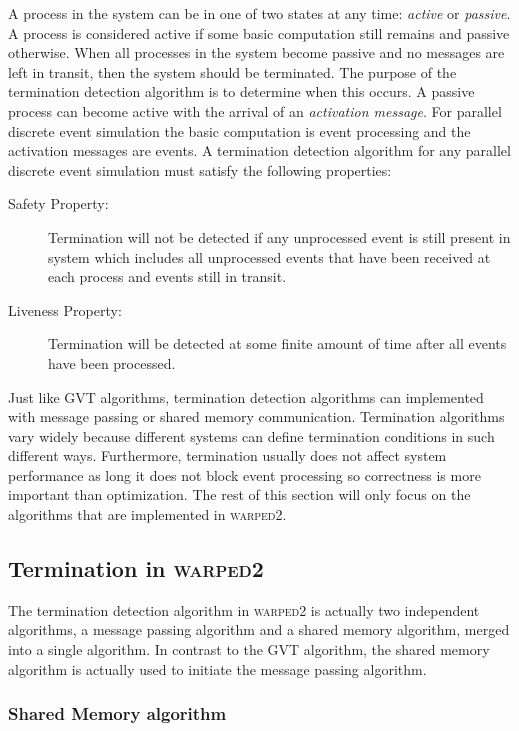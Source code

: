 \documentclass[11pt]{book}
\begin{document}
A process in the system can be in one of two states at any time: \emph{active} or \emph{passive}.  A
process is considered active if some basic computation still remains and passive otherwise.  When
all processes in the system become passive and no messages are left in transit, then the system
should be terminated.  The purpose of the termination detection algorithm is to determine when this
occurs.  A passive process can become active with the arrival of an \emph{activation message}.  For
parallel discrete event simulation the basic computation is event processing and the activation
messages are events.  A termination detection algorithm for any parallel discrete event simulation
must satisfy the following properties:

\begin{description}
    \item[Safety Property:] Termination will not be detected if any unprocessed event is still
      present in system which includes all unprocessed events that have been received at each
      process and events still in transit.
    \item[Liveness Property:] Termination will be detected at some finite amount of time after all
      events have been processed.
\end{description}

\noindent
Just like GVT algorithms, termination detection algorithms can implemented with message passing or
shared memory communication.  Termination algorithms vary widely because different systems can
define termination conditions in such different ways.  Furthermore, termination usually does not
affect system performance as long it does not block event processing so correctness is more
important than optimization.  The rest of this section will only focus on the algorithms that are
implemented in \textsc{warped2}.

\subsection{Termination in \textsc{warped2}}

The termination detection algorithm in \textsc{warped2} is actually two independent algorithms, a
message passing algorithm and a shared memory algorithm, merged into a single algorithm.  In
contrast to the GVT algorithm, the shared memory algorithm is actually used to initiate the message
passing algorithm.

\subsubsection{Shared Memory algorithm}
\end{document}
